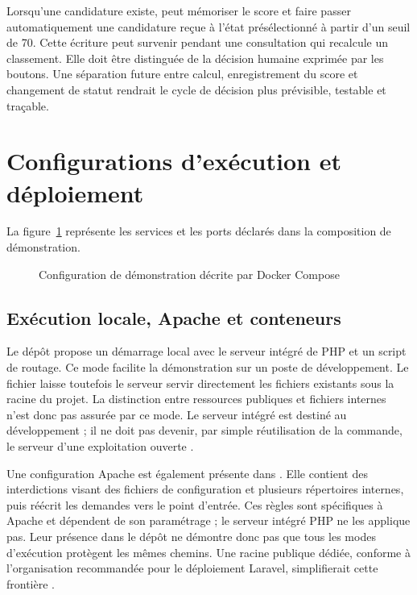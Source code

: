 Lorsqu'une candidature existe,  peut mémoriser le score et faire passer automatiquement une candidature reçue à l'état présélectionné à partir d'un seuil de 70. Cette écriture peut survenir pendant une consultation qui recalcule un classement. Elle doit être distinguée de la décision humaine exprimée par les boutons. Une séparation future entre calcul, enregistrement du score et changement de statut rendrait le cycle de décision plus prévisible, testable et traçable.

\section{Configurations d'exécution et déploiement}

La figure~\ref{fig:deployment} représente les services et les ports déclarés dans la composition de démonstration.

\begin{figure}[htbp]
\centering

\caption{Configuration de démonstration décrite par Docker Compose}
\label{fig:deployment}
\end{figure}

\subsection{Exécution locale, Apache et conteneurs}

Le dépôt propose un démarrage local avec le serveur intégré de PHP et un script de routage. Ce mode facilite la démonstration sur un poste de développement. Le fichier  laisse toutefois le serveur servir directement les fichiers existants sous la racine du projet. La distinction entre ressources publiques et fichiers internes n'est donc pas assurée par ce mode. Le serveur intégré est destiné au développement ; il ne doit pas devenir, par simple réutilisation de la commande, le serveur d'une exploitation ouverte \cite{php-server}.

Une configuration Apache est également présente dans . Elle contient des interdictions visant des fichiers de configuration et plusieurs répertoires internes, puis réécrit les demandes vers le point d'entrée. Ces règles sont spécifiques à Apache et dépendent de son paramétrage ; le serveur intégré PHP ne les applique pas. Leur présence dans le dépôt ne démontre donc pas que tous les modes d'exécution protègent les mêmes chemins. Une racine publique dédiée, conforme à l'organisation recommandée pour le déploiement Laravel, simplifierait cette frontière \cite{laravel-deployment}.

